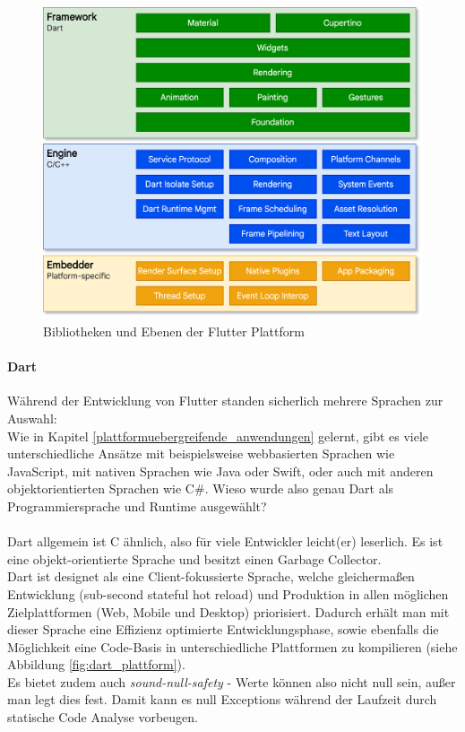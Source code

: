\begin{figure}[tbt]
	\begin{center}
		\includegraphics[scale=0.25]{Theoretische_Grundlagen/images/flutter_architektur.png}
	\end{center}
	\caption{Bibliotheken und Ebenen der Flutter Plattform \protect \footnotemark}
	\label{fig:flutter_plattform}
\end{figure}

\paragraph{Dart}
Während der Entwicklung von Flutter standen sicherlich mehrere Sprachen zur Auswahl: \\Wie in Kapitel \ref{plattformuebergreifende_anwendungen} gelernt, gibt es viele unterschiedliche Ansätze mit beispielsweise webbasierten Sprachen wie JavaScript, mit nativen Sprachen wie Java oder Swift, oder auch mit anderen objektorientierten Sprachen wie C\#. Wieso wurde also genau Dart als Programmiersprache und Runtime ausgewählt?\\
\\
Dart allgemein ist C ähnlich, also für viele Entwickler leicht(er) leserlich. Es ist eine objekt-orientierte Sprache und besitzt einen Garbage Collector.\\
Dart ist designet als eine Client-fokussierte Sprache, welche gleichermaßen Entwicklung (sub-second stateful hot reload) und Produktion in allen möglichen Zielplattformen (Web, Mobile und Desktop) priorisiert. Dadurch erhält man mit dieser Sprache eine Effizienz optimierte Entwicklungsphase, sowie ebenfalls die Möglichkeit eine Code-Basis in unterschiedliche Plattformen zu kompilieren (siehe Abbildung \ref{fig:dart_plattform}).\\
Es bietet zudem auch \textit{sound-null-safety} - Werte können also nicht null sein, außer man legt dies fest. Damit kann es null Exceptions während der Laufzeit durch statische Code Analyse vorbeugen.

